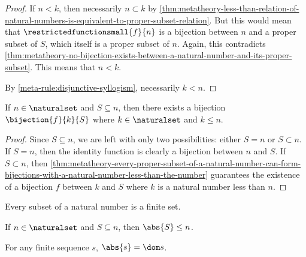 \begin{proof}
    \vspace{0.3cm}
    \noindent
    If \( n < k \), then necessarily \( n \subset k \) by \cref{thm:metatheory-less-than-relation-of-natural-numbers-is-equivalent-to-proper-subset-relation}.
    But this would mean that \( \restrictedfunctionsmall{f}{n} \) is a bijection between \( n \) and a proper subset of \( S \), which itself is a proper subset
    of \( n \). Again, this contradicts \cref{thm:metatheory-no-bijection-exists-between-a-natural-number-and-its-proper-subset}.
    This means that \( n < k \).

    \vspace{0.3cm}
    \noindent
    By \cref{meta-rule:disjunctive-syllogism}, necessarily \( k < n \).
\end{proof}

\begin{thm}
     \label{thm:metatheory-every-subset-of-a-natural-number-can-form-bijections-with-a-natural-number-less-than-or-equals-to-the-number}
    If \( n \in \naturalset \) and \( S \subseteq n \), then there exists a bijection \( \bijection{f}{k}{S} \) where \( k \in \naturalset \)
    and \( k \leq n \).
\end{thm}

\begin{proof}
    Since \( S \subseteq n \), we are left with only two possibilities: either \( S = n \) or \( S \subset n \).
    If \( S = n \), then the identity function is clearly a bijection between \( n \) and \( S \).
    If \( S \subset n \), then \cref{thm:metatheory-every-proper-subset-of-a-natural-number-can-form-bijections-with-a-natural-number-less-than-the-number}
    guarantees the existence of a bijection \( f \) between \( k \) and \( S \) where \( k \) is a natural number less than \( n \).
\end{proof}

\begin{cor}
     \label{cor:metatheory-every-subset-of-a-natural-number-is-a-finite-set}
    Every subset of a natural number is a finite set.
\end{cor}

\begin{cor}
     \label{cor:metatheory-the-cardinality-of-any-subset-of-a-natural-number-is-less-than-or-equals-to-the-number}
    If \( n \in \naturalset \) and \( S \subseteq n \), then \( \abs{S} \leq n \).
\end{cor}

\begin{thm}
     \label{thm:metatheory-the-cardinality-of-any-finite-sequence-is-its-domain}
    For any finite sequence \( s \), \( \abs{s} = \dom s \).
\end{thm}


